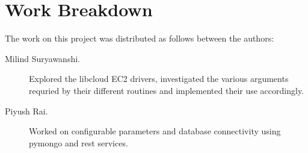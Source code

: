 \documentclass[9pt,twocolumn,twoside]{../../styles/osajnl}
\begin{document}
\endgroup

\newpage

\appendix

\section{Work Breakdown}

The work on this project was distributed as follows between the
authors:

\begin{description}

\item[Milind Suryawanshi.] Explored the libcloud EC2 drivers, investigated the various arguments requried by their different routines and implemented their use accordingly.

\item[Piyush Rai.] Worked on configurable parameters and database connectivity using pymongo and rest services.

\end{description}
\end{document}
